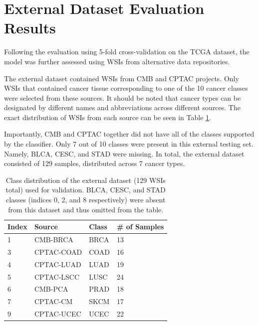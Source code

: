 \documentclass{l4proj}
\begin{document}
\section{External Dataset Evaluation Results} \label{sec:external}
Following the evaluation using 5-fold cross-validation on the TCGA dataset, the model was further assessed using WSIs from alternative data repositories.

The external dataset contained WSIs from CMB and CPTAC projects. Only WSIs that contained cancer tissue corresponding to one of the 10 cancer classes were selected from these sources. It should be noted that cancer types can be designated by different names and abbreviations across different sources. The exact distribution of WSIs from each source can be seen in Table \ref{tab:extdata}. 

Importantly, CMB and CPTAC together did not have all of the classes supported by the classifier. Only 7 out of 10 classes were present in this external testing set. Namely, BLCA, CESC, and STAD were missing. In total, the external dataset consisted of 129 samples, distributed across 7 cancer types.

\begin{table}[b]
\centering
\caption{Class distribution of the external dataset (129 WSIs total) used for validation. BLCA, CESC, and STAD classes (indices 0, 2, and 8 respectively) were absent from this dataset and thus omitted from the table.}
\label{tab:extdata}
\begin{tabular}{@{}llll@{}}
\textbf{Index} & \textbf{Source} & \textbf{Class} & \textbf{\# of Samples} \\ \midrule
1              & CMB-BRCA        & BRCA           & 13                     \\
3              & CPTAC-COAD      & COAD           & 16                     \\
4              & CPTAC-LUAD      & LUAD           & 19                     \\
5              & CPTAC-LSCC      & LUSC           & 24                     \\
6              & CMB-PCA         & PRAD           & 18                     \\
7              & CPTAC-CM        & SKCM           & 17                     \\
9              & CPTAC-UCEC      & UCEC           & 22                    
\end{tabular}
\end{table}
\end{document}
